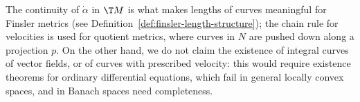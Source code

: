 \begin{remark}
  \label{rem:man-curves-ode}
  The continuity of $\dot\alpha$ in $\T M$ is what makes lengths of curves meaningful for Finsler
  metrics (see Definition~\ref{def:finsler-length-structure}); the chain rule for velocities is used for quotient
  metrics, where curves in $N$ are pushed down along a projection $p$. On the other hand, we do
  not claim the existence of integral curves of vector fields, or of curves with prescribed
  velocity: this would require existence theorems for ordinary differential equations, which
  fail in general locally convex spaces, and in Banach spaces need completeness.
\end{remark}

